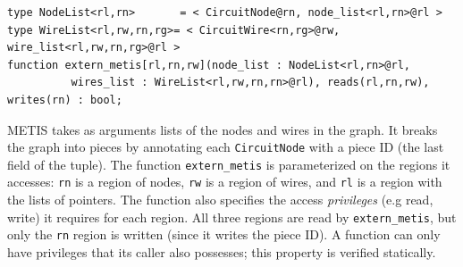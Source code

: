 \begin{lstlisting}[label={lst:metis},caption={Partition Computation}]
type NodeList<rl,rn>       = < CircuitNode@rn, node_list<rl,rn>@rl >
type WireList<rl,rw,rn,rg>= < CircuitWire<rn,rg>@rw, wire_list<rl,rw,rn,rg>@rl >
function extern_metis[rl,rn,rw](node_list : NodeList<rl,rn>@rl,
          wires_list : WireList<rl,rw,rn,rn>@rl), reads(rl,rn,rw), writes(rn) : bool;
\end{lstlisting}

METIS takes as arguments lists of the nodes and wires in
the graph.  It breaks the graph into pieces by annotating each 
{\tt CircuitNode} with a piece ID (the last field of the tuple).
The function {\tt extern\_metis} is parameterized on the regions it 
accesses: {\tt rn} is a region of nodes, {\tt rw} is a region of wires, 
and {\tt rl} is a region with the lists of pointers.  The function
also specifies the access {\em privileges} (e.g read, write) it requires for each 
region.  All three regions are read by {\tt extern\_metis}, but only the {\tt rn}
region is written (since it writes the piece ID).  A function can only 
have privileges that its caller also possesses; this property is verified statically. 

